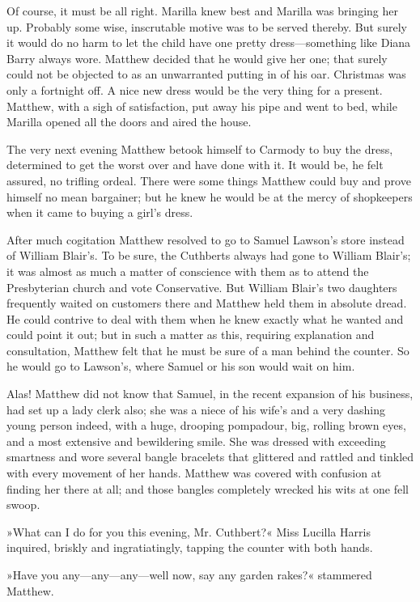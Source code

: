 Of course, it must be all right. Marilla knew best and Marilla was bringing her up. Probably some wise, inscrutable motive was to be served thereby. But surely it would do no harm to let the child have one pretty dress—something like Diana Barry always wore. Matthew decided that he would give her one; that surely could not be objected to as an unwarranted putting in of his oar. Christmas was only a fortnight off. A nice new dress would be the very thing for a present. Matthew, with a sigh of satisfaction, put away his pipe and went to bed, while Marilla opened all the doors and aired the house.

The very next evening Matthew betook himself to Carmody to buy the dress, determined to get the worst over and have done with it. It would be, he felt assured, no trifling ordeal. There were some things Matthew could buy and prove himself no mean bargainer; but he knew he would be at the mercy of shopkeepers when it came to buying a girl's dress.

After much cogitation Matthew resolved to go to Samuel Lawson's store instead of William Blair's. To be sure, the Cuthberts always had gone to William Blair's; it was almost as much a matter of conscience with them as to attend the Presbyterian church and vote Conservative. But William Blair's two daughters frequently waited on customers there and Matthew held them in absolute dread. He could contrive to deal with them when he knew exactly what he wanted and could point it out; but in such a matter as this, requiring explanation and consultation, Matthew felt that he must be sure of a man behind the counter. So he would go to Lawson's, where Samuel or his son would wait on him.

Alas! Matthew did not know that Samuel, in the recent expansion of his business, had set up a lady clerk also; she was a niece of his wife's and a very dashing young person indeed, with a huge, drooping pompadour, big, rolling brown eyes, and a most extensive and bewildering smile. She was dressed with exceeding smartness and wore several bangle bracelets that glittered and rattled and tinkled with every movement of her hands. Matthew was covered with confusion at finding her there at all; and those bangles completely wrecked his wits at one fell swoop.

»What can I do for you this evening, Mr. Cuthbert?« Miss Lucilla Harris inquired, briskly and ingratiatingly, tapping the counter with both hands.

»Have you any—any—any—well now, say any garden rakes?« stammered Matthew.

